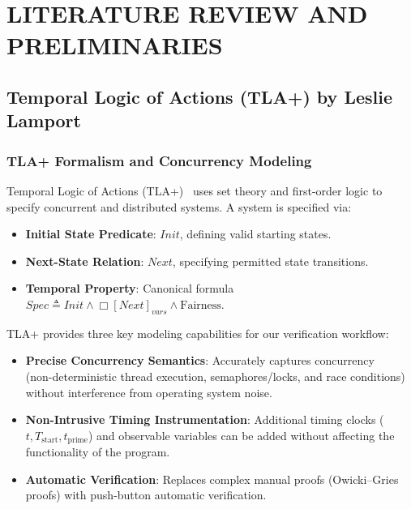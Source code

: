 \documentclass[a4paper,12pt]{report}
\begin{document}
\chapter{LITERATURE REVIEW AND PRELIMINARIES}

\section{Temporal Logic of Actions (TLA+) by Leslie Lamport}

\subsection{TLA+ Formalism and Concurrency Modeling}
Temporal Logic of Actions (TLA+)~\cite{lamport2002specifying} uses set theory and first-order logic to specify concurrent and distributed systems. A system is specified via:
\begin{itemize}[itemsep=0.2em, topsep=0.15em]
    \item \textbf{Initial State Predicate}: $Init$, defining valid starting states.
    \item \textbf{Next-State Relation}: $Next$, specifying permitted state transitions.
    \item \textbf{Temporal Property}: Canonical formula $Spec \triangleq Init \land \Box[Next]_{vars} \land \text{Fairness}$.
\end{itemize}
TLA+ provides three key modeling capabilities for our verification workflow:
\begin{itemize}[itemsep=0.25em, topsep=0.15em]
    \item \textbf{Precise Concurrency Semantics}: Accurately captures concurrency \\ (non-deterministic thread execution, semaphores/locks, and race conditions) without interference from operating system noise.
    \item \textbf{Non-Intrusive Timing Instrumentation}: Additional timing clocks ($t, T_{\text{start}}, t_{\text{prime}}$) and observable variables can be added without affecting the functionality of the program.
    \item \textbf{Automatic Verification}: Replaces complex manual proofs (Owicki--Gries proofs) with push-button automatic verification.
\end{itemize}
\end{document}
